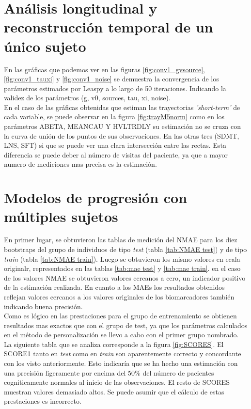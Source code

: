 \section{Análisis longitudinal y reconstrucción temporal de un único sujeto}

En las gráficas que podemos ver en las figuras \ref{fig:conv1_gvsource}, \ref{fig:conv1_tauxi} y \ref{fig:conv1_noise} se demuestra la convergencia de los parámetros estimados por Leaspy a lo largo de 50 iteraciones. Indicando la validez de los parámetros (g, v0, sources, tau, xi, noise).\\

En el caso de las gráficas obtenidas que estiman las trayectorias \textit{'short-term'} de cada variable, se puede observar en la figura \ref{fig:trayM5norm} como en los parámetros ABETA, MEANCAU Y HVLTRDLY su estimación no se cruza con la curva de unión de los puntos de sus observaciones. En las otras tres (SDMT, LNS, SFT) si que se puede ver una clara intersección entre las rectas. Esta diferencia se puede deber al número de visitas del paciente, ya que a mayor numero de mediciones mas precisa es la estimación.


\section{Modelos de progresión con múltiples sujetos}
En primer lugar, se obtuvieron las tablas de medición del NMAE para los diez bootstraps del grupo de individuos de tipo \textit{test} (tabla \ref{tab:NMAE test}) y de tipo \textit{train} (tabla \ref{tab:NMAE train}). Luego se obtuvieron los mismo valores en ecala originalr, representados en las tablas \ref{tab:mae test} y \ref{tab:mae train}. en el caso de los valores NMAE se obtuvieron valores cercanos a cero, un indicador positivo de la estimación realizada. En cuanto a los MAEs los resultados obtenidos reflejan valores cercanos a los valores originales de los biomarcadores también indicando buena precisión.  \\

Como es lógico en las prestaciones para el grupo de entrenamiento se obtienen resultados mas exactos que con el grupo de test, ya que los parámetros calculados en el método de personalización se llevo a cabo con el primer grupo nombrado.\\

La siguiente tabla que se analiza corresponde a la figura \ref{fig:SCORES}. El SCORE1 tanto en \textit{test} como en \textit{train} son aparentemente correcto y concordante con los visto anteriormente. Esto indicaría que se ha hecho una estimación con una precisión ligeramente por encima del 50\% del número de pacientes cogniticamente normales al inicio de las observaciones.
El resto de SCORES muestran valores demasiado altos. Se puede asumir que el cálculo de estas prestaciones es incorrecto. 
